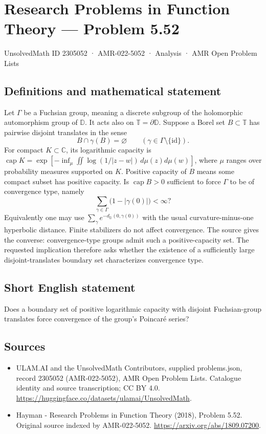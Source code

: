 \documentclass[11pt,a4paper]{article}
\begin{document}
\section*{Research Problems in Function Theory — Problem 5.52}\label{2305052}
{\small UnsolvedMath ID 2305052 · AMR-022-5052 · Analysis · AMR Open Problem Lists}
\subsection{Definitions and mathematical statement}
Let $\Gamma$ be a Fuchsian group, meaning a discrete subgroup of the holomorphic automorphism group of $\mathbb D$. It acts also on $\mathbb T=\partial\mathbb D$. Suppose a Borel set $B\subset\mathbb T$ has pairwise disjoint translates in the sense
\[
B\cap\gamma(B)=\varnothing\qquad
(\gamma\in\Gamma\setminus\{\mathrm{id}\}).
\]
For compact $K\subset\mathbb C$, its logarithmic capacity is
$\operatorname{cap}K=\exp[-\inf_\mu\iint\log(1/|z-w|)\,d\mu(z)d\mu(w)]$, where $\mu$ ranges over probability measures supported on $K$. Positive capacity of $B$ means some compact subset has positive capacity.
Is $\operatorname{cap}B>0$ sufficient to force $\Gamma$ to be of convergence type, namely
\[
\sum_{\gamma\in\Gamma}\bigl(1-|\gamma(0)|\bigr)<\infty?
\]
Equivalently one may use $\sum_\gamma e^{-d_{\mathbb D}(0,\gamma(0))}$ with the usual curvature-minus-one hyperbolic distance. Finite stabilizers do not affect convergence. The source gives the converse: convergence-type groups admit such a positive-capacity set. The requested implication therefore asks whether the existence of a sufficiently large disjoint-translates boundary set characterizes convergence type.
\subsection{Short English statement}
Does a boundary set of positive logarithmic capacity with disjoint Fuchsian-group translates force convergence of the group's Poincaré series?
\subsection{Sources}
\begin{itemize}
\item[S1] ULAM.AI and the UnsolvedMath Contributors, supplied problems.json, record 2305052 (AMR-022-5052), AMR Open Problem Lists. Catalogue identity and source transcription; CC BY 4.0.
\url{https://huggingface.co/datasets/ulamai/UnsolvedMath}.
\item[S2] Hayman - Research Problems in Function Theory (2018), Problem 5.52. Original source indexed by AMR-022-5052.
\url{https://arxiv.org/abs/1809.07200}.
\end{itemize}
\end{document}

